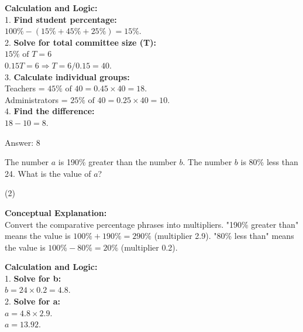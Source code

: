 \documentclass[11pt,paper=a4,answers]{exam}
\begin{document}
\begin{questions}
\begin{solution}
\vspace{30pt}

\textbf{Calculation and Logic:} \\
1. \textbf{Find student percentage:} \\
   $100\% - (15\% + 45\% + 25\%) = 15\%$. \\
2. \textbf{Solve for total committee size (T):} \\
   $15\% \text{ of } T = 6$ \\
   $0.15T = 6 \Rightarrow T = 6 / 0.15 = 40$. \\
3. \textbf{Calculate individual groups:} \\
   Teachers = $45\% \text{ of } 40 = 0.45 \times 40 = 18$. \\
   Administrators = $25\% \text{ of } 40 = 0.25 \times 40 = 10$. \\
4. \textbf{Find the difference:} \\
   $18 - 10 = 8$.

\vspace{30pt}

Answer: \colorbox{yellow!100}{8}
\end{solution}

\vspace{60pt}

\question
The number $a$ is 190\% greater than the number $b$. The number $b$ is 80\% less than 24. What is the value of $a$?
\begin{tasks}(2)
\end{tasks}

\begin{solution}
\textbf{Conceptual Explanation:} \\
Convert the comparative percentage phrases into multipliers. "190\% greater than" means the value is $100\% + 190\% = 290\%$ (multiplier 2.9). "80\% less than" means the value is $100\% - 80\% = 20\%$ (multiplier 0.2).

\vspace{30pt}

\textbf{Calculation and Logic:} \\
1. \textbf{Solve for b:} \\
   $b = 24 \times 0.2 = 4.8$. \\
2. \textbf{Solve for a:} \\
   $a = 4.8 \times 2.9$. \\
   $a = 13.92$.


\end{solution}
\end{questions}
\end{document}
